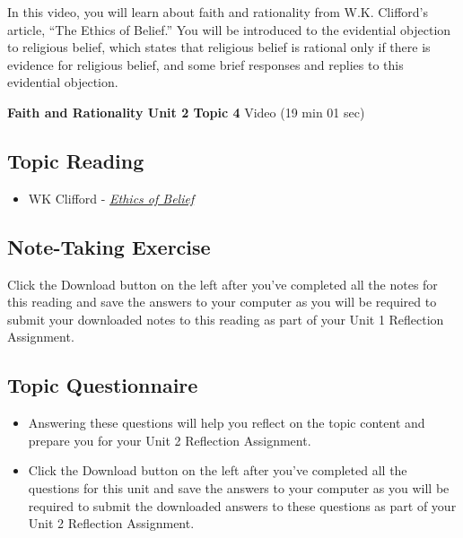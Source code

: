 \documentclass[
]{book}
\providecommand{\tightlist}{%
  \setlength{\itemsep}{0pt}\setlength{\parskip}{0pt}}
\begin{document}
In this video, you will learn about faith and rationality from W.K. Clifford's article, ``The Ethics of Belief.'' You will be introduced to the evidential objection to religious belief, which states that religious belief is rational only if there is evidence for religious belief, and some brief responses and replies to this evidential objection.

\textbf{Faith and Rationality Unit 2 Topic 4} Video (19 min 01 sec)

\hypertarget{topic-reading-7}{%
\subsection*{Topic Reading}\label{topic-reading-7}}

\begin{itemize}
\tightlist
\item
  WK Clifford - \href{assets/u2/PHIL-100-Clifford-Ethics-of-Belief.pdf}{\emph{Ethics of Belief}}
\end{itemize}

\hypertarget{note-taking-exercise-7}{%
\subsection*{Note-Taking Exercise}\label{note-taking-exercise-7}}

\begin{reflect}
Click the Download button on the left after you've completed all the notes for this reading and save the answers to your computer as you will be required to submit your downloaded notes to this reading as part of your Unit 1 Reflection Assignment.
\end{reflect}

\hypertarget{topic-questionnaire-7}{%
\subsection*{Topic Questionnaire}\label{topic-questionnaire-7}}

\begin{reflect}
\begin{itemize}
\tightlist
\item
  Answering these questions will help you reflect on the topic content and prepare you for your Unit 2 Reflection Assignment.
\item
  Click the Download button on the left after you've completed all the questions for this unit and save the answers to your computer as you will be required to submit the downloaded answers to these questions as part of your Unit 2 Reflection Assignment.
\end{itemize}
\end{reflect}
\end{document}
